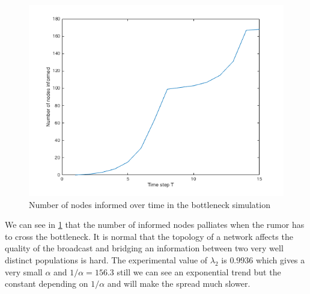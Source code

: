 \documentclass[10pt,journal,a4paper]{IEEEtran}
\begin{document}
\begin{figure}[h]
\centering
\includegraphics[width=1\linewidth]{figs/split-chart}
\caption{Number of nodes informed over time in the bottleneck simulation}
\label{fig:split-chart}
\end{figure}

We can see in \cref{fig:split-chart} that the number of informed nodes palliates when the rumor has to cross the bottleneck. It is normal that the topology of a network affects the quality of the broadcast and bridging an information between two very well distinct populations is hard. The experimental value of $\lambda_2$ is $0.9936$ which gives a very small $\alpha$ and $1/\alpha = 156.3$ still we can see an exponential trend but the constant depending on $1/\alpha$ and will make the spread much slower.
\end{document}
